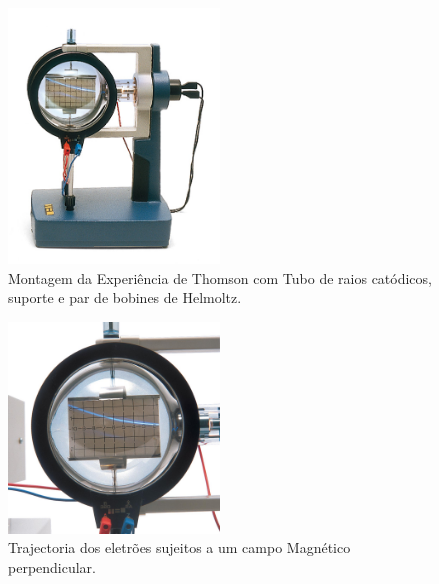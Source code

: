 \documentclass[a4paper,twoside,12pt]{article}      %
\begin{document}
\begin{figure}
	[htb]  \centering 
	\includegraphics[width=0.5\textwidth]{./ThomsomEquip}
	\caption{Montagem da Experiência de Thomson com Tubo de raios catódicos, suporte e par de bobines de Helmoltz. \label{fig:Thomson_Equip}} 
\end{figure}

\begin{figure}
	[htb]  \centering 
	\includegraphics[width=0.5\textwidth]{./Thomson_Electron-Deflection-Tube-D}
	\caption{Trajectoria dos eletrões sujeitos a um campo Magnético perpendicular. \label{fig:Thomson_trajec}} 
\end{figure}

\newpage
\end{document}
